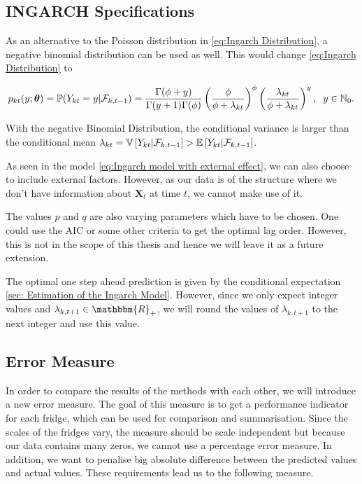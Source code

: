 \subsection{INGARCH Specifications}
\label{sec: Ingarch Specifications}

As an alternative to the Poisson distribution in \ref{eq:Ingarch Distribution}, a negative binomial distribution can be used as well. This would change \ref{eq:Ingarch Distribution} to 

\begin{equation}
p_{kt}(y;\bm{\theta})=\mathbb{P}(Y_{kt}=y | \mathcal{F}_{k,t-1}) = \frac{\Gamma(\phi+y)}{\Gamma(y+1)\Gamma(\phi)}\left(\frac{\phi}{\phi+\lambda_{kt}}\right)^\phi\left(\frac{\lambda_{kt}}{\phi+\lambda_{kt}}\right)^y, \hspace{0.2cm} y \in \mathbb{N}_0.
\label{eq:Ingarch negbinom Distribution}
\end{equation}

With the negative Binomial Distribution, the conditional variance is larger than the conditional mean $\lambda_{kt} = \mathbb{V}\left[Y_{kt} | \mathcal{F}_{k,t-1}\right] > \mathbb{E}\left[Y_{kt} | \mathcal{F}_{k,t-1}\right]$.

As seen in the model \ref{eq:Ingarch model with external effect}, we can also choose to include external factors. However, as our data is of the structure where we don't have information about $\bm{X}_t$ at time $t$, we cannot make use of it. 

The values $p$ and $q$ are also varying parameters which have to be chosen. One could use the AIC or some other criteria to get the optimal lag order. However, this is not in the scope of this thesis and hence we will leave it as a future extension.

The optimal one step ahead prediction is given by the conditional expectation \ref{sec: Estimation of the Ingarch Model}. However, since we only expect integer values and $\lambda_{k,t+1} \in \mathbbm{R}_+$, we will round the values of $\lambda_{k,t+1}$ to the next integer and use this value. 



\subsection{Error Measure}
\label{sec: Error Measure}

In order to compare the results of the methods with each other, we will introduce a new error measure. The goal of this measure is to get a performance indicator for each fridge, which can be used for comparison and summarisation. Since the scales of the fridges vary, the measure should be scale independent but because our data contains many zeros, we cannot use a percentage error measure. In addition, we want to penalise big absolute difference between the predicted values and actual values. These requirements lead us to the following measure.

